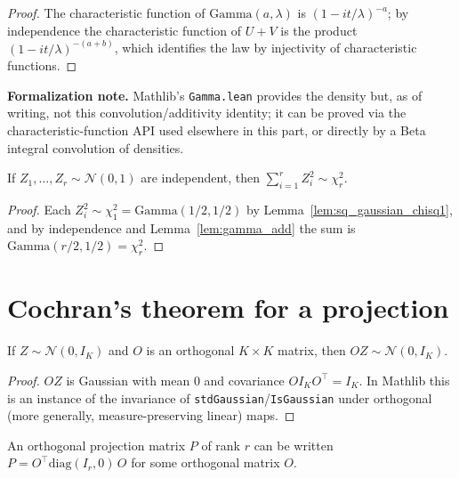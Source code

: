 \begin{proof}
The characteristic function of $\mathrm{Gamma}(a,\lambda)$ is
$(1 - it/\lambda)^{-a}$; by independence the characteristic function of $U+V$ is
the product $(1-it/\lambda)^{-(a+b)}$, which identifies the law by injectivity of
characteristic functions.
\end{proof}

\textbf{Formalization note.} Mathlib's \texttt{Gamma.lean} provides the density
but, as of writing, not this convolution/additivity identity; it can be proved via
the characteristic-function API used elsewhere in this part, or directly by a Beta
integral convolution of densities.

\begin{lemma}\label{lem:sum_sq_chisq}
If $Z_1,\dots,Z_r\sim\mathcal{N}(0,1)$ are independent, then
$\sum_{i=1}^r Z_i^2\sim\chi^2_r$.
\end{lemma}

\begin{proof}
Each $Z_i^2\sim\chi^2_1=\mathrm{Gamma}(1/2,1/2)$ by
Lemma~\ref{lem:sq_gaussian_chisq1}, and by independence and
Lemma~\ref{lem:gamma_add} the sum is $\mathrm{Gamma}(r/2,1/2)=\chi^2_r$.
\end{proof}

\section{Cochran's theorem for a projection}
\label{sec:pre_cochran_thm}

\begin{lemma}\label{lem:gaussian_rotation}
If $Z\sim\mathcal{N}(0,I_K)$ and $O$ is an orthogonal $K\times K$ matrix, then
$OZ\sim\mathcal{N}(0,I_K)$.
\end{lemma}

\begin{proof}
$OZ$ is Gaussian with mean $0$ and covariance $O I_K O^\top = I_K$. In Mathlib
this is an instance of the invariance of \texttt{stdGaussian}/\texttt{IsGaussian}
under orthogonal (more generally, measure-preserving linear) maps.
\end{proof}

\begin{lemma}\label{lem:proj_diag}
An orthogonal projection matrix $P$ of rank $r$ can be written
$P = O^\top \mathrm{diag}(I_r, 0)\, O$ for some orthogonal matrix $O$.
\end{lemma}

